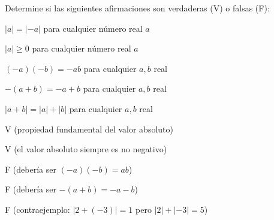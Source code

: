 \begin{exercise}
\problem Determine si las siguientes afirmaciones son verdaderas (V) o falsas (F):

\begin{exerciselist}
    \item $|a| = |-a|$ para cualquier número real $a$ \hspace{2cm} \underline{\hspace{2cm}}
    \item $|a| \geq 0$ para cualquier número real $a$ \hspace{2cm} \underline{\hspace{2cm}}
    \item $(-a)(-b) = -ab$ para cualquier $a, b$ real \hspace{2cm} \underline{\hspace{2cm}}
    \item $-(a + b) = -a + b$ para cualquier $a, b$ real \hspace{2cm} \underline{\hspace{2cm}}
    \item $|a + b| = |a| + |b|$ para cualquier $a, b$ real \hspace{2cm} \underline{\hspace{2cm}}
\end{exerciselist}

\begin{solucion}
\begin{exerciselist}
    \item V (propiedad fundamental del valor absoluto)
    \item V (el valor absoluto siempre es no negativo)
    \item F (debería ser $(-a)(-b) = ab$)
    \item F (debería ser $-(a + b) = -a - b$)
    \item F (contraejemplo: $|2 + (-3)| = 1$ pero $|2| + |-3| = 5$)
\end{exerciselist}
\end{solucion}
\end{exercise}

